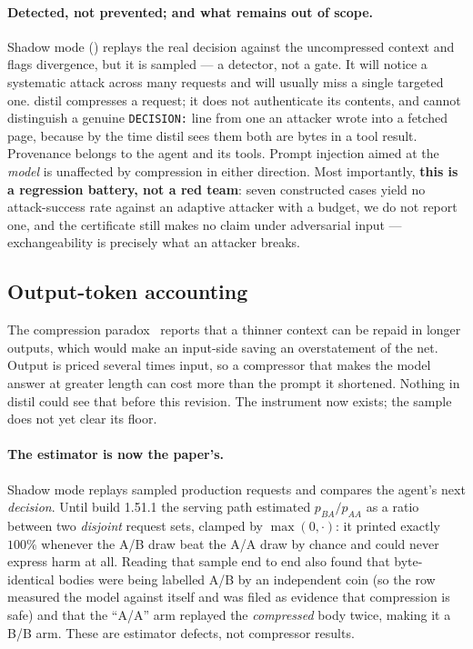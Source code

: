 \documentclass[11pt]{article}
\begin{document}
\paragraph{Detected, not prevented; and what remains out of scope.} Shadow mode
() replays the real decision against the uncompressed context and
flags divergence, but it is sampled --- a detector, not a gate. It will notice a systematic
attack across many requests and will usually miss a single targeted one. distil compresses a
request; it does not authenticate its contents, and cannot distinguish a genuine
\texttt{DECISION:} line from one an attacker wrote into a fetched page, because by the time
distil sees them both are bytes in a tool result. Provenance belongs to the agent and its
tools. Prompt injection aimed at the \emph{model} is unaffected by compression in either
direction. Most importantly, \textbf{this is a regression battery, not a red team}: seven
constructed cases yield no attack-success rate against an adaptive attacker with a budget,
we do not report one, and the certificate still makes no claim under adversarial input ---
exchangeability is precisely what an attacker breaks.

\subsection{Output-token accounting}
\label{sec:todo-output}

The compression paradox~\cite{compressionparadox} reports that a thinner context can be
repaid in longer outputs, which would make an input-side saving an overstatement of the net.
Output is priced several times input, so a compressor that makes the model answer at greater
length can cost more than the prompt it shortened. Nothing in distil could see that before
this revision. The instrument now exists; the sample does not yet clear its floor.

\paragraph{The estimator is now the paper's.} Shadow mode replays sampled production requests
and compares the agent's next \emph{decision}. Until build 1.51.1 the serving path estimated
$p_{BA}/p_{AA}$ as a ratio between two \emph{disjoint} request sets, clamped by
$\max(0,\cdot)$: it printed exactly $100\%$ whenever the A/B draw beat the A/A draw by chance
and could never express harm at all. Reading that sample end to end also found that
byte-identical bodies were being labelled A/B by an independent coin (so the row measured the
model against itself and was filed as evidence that compression is safe) and that the ``A/A''
arm replayed the \emph{compressed} body twice, making it a B/B arm. These are estimator
defects, not compressor results.
\end{document}
